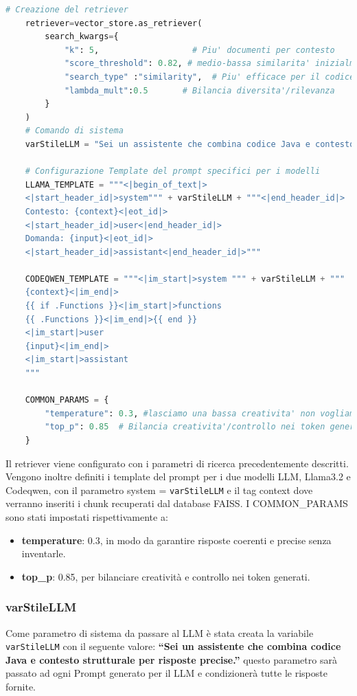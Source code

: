 \documentclass[12pt,a4paper,openright,twoside]{book}
\begin{document}
\begin{lstlisting}[language=Python, caption={Configurazione Parametri}, label={lst:Configurazione Parametri}]
    # Creazione del retriever
    retriever=vector_store.as_retriever(
        search_kwargs={
            "k": 5,                   # Piu' documenti per contesto
            "score_threshold": 0.82, # medio-bassa similarita' inizialmente era 0.90
            "search_type" :"similarity",  # Piu' efficace per il codice
            "lambda_mult":0.5       # Bilancia diversita'/rilevanza
        }
    )
    # Comando di sistema
    varStileLLM = "Sei un assistente che combina codice Java e contesto strutturale per risposte precise."

    # Configurazione Template del prompt specifici per i modelli
    LLAMA_TEMPLATE = """<|begin_of_text|>
    <|start_header_id|>system""" + varStileLLM + """<|end_header_id|>
    Contesto: {context}<|eot_id|>
    <|start_header_id|>user<|end_header_id|>
    Domanda: {input}<|eot_id|>
    <|start_header_id|>assistant<|end_header_id|>"""

    CODEQWEN_TEMPLATE = """<|im_start|>system """ + varStileLLM + """
    {context}<|im_end|>
    {{ if .Functions }}<|im_start|>functions
    {{ .Functions }}<|im_end|>{{ end }}
    <|im_start|>user
    {input}<|im_end|>
    <|im_start|>assistant
    """

    COMMON_PARAMS = {
        "temperature": 0.3, #lasciamo una bassa creativita' non vogliamo che inventi risposte
        "top_p": 0.85  # Bilancia creativita'/controllo nei token generati
    }
\end{lstlisting}
Il retriever viene configurato con i parametri di ricerca precedentemente descritti.
Vengono inoltre definiti i template del prompt per i due modelli LLM, Llama3.2 e Codeqwen, con il parametro system = \texttt{varStileLLM} e il tag context dove verranno inseriti i chunk recuperati dal database FAISS.
I COMMON\_PARAMS sono stati impostati rispettivamente a:
\begin{itemize}
    \item \textbf{temperature}: 0.3, in modo da garantire risposte coerenti e precise senza inventarle.
    \item \textbf{top\_p}: 0.85, per bilanciare creatività e controllo nei token generati.
\end{itemize}
\subsubsection{varStileLLM}
Come parametro di sistema da passare al LLM è stata creata la variabile \texttt{varStileLLM} con il seguente valore: \textbf{``Sei un assistente che combina codice Java e contesto strutturale per risposte precise.''}
questo parametro sarà passato ad ogni Prompt generato per il LLM e condizionerà tutte le risposte fornite.
\end{document}
